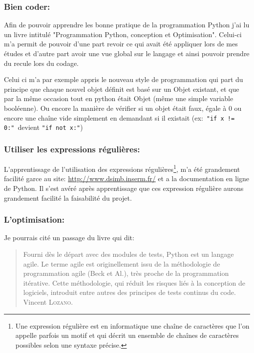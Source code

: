         \subsubsection{Bien coder:\label{pygood}}
Afin de pouvoir apprendre les bonne pratique de la programmation Python j'ai lu un livre intitulé "Programmation Python, conception et Optimisation"\cite{pybook}. Celui-ci m'a permit de pouvoir d'une part revoir ce qui avait été appliquer lors de mes études et d'autre part avoir une vue global sur le langage et ainsi pouvoir prendre du recule lors du codage.

Celui ci m'a par exemple appris le nouveau style de programmation qui part du principe que chaque nouvel objet définit est basé sur un Objet existant, et que par la même occasion tout en python était Objet (même une simple variable booléenne). Ou encore la manière de vérifier si un objet était faux, égale à 0 ou encore une chaîne vide simplement en demandant si il existait (ex:~\texttt{"if x != 0:"}~devient \texttt{"if not x:"})

        \subsubsection{Utiliser les expressions régulières:} 
L'apprentissage de l'utilisation des expressions régulières\footnote{Une expression régulière est en informatique une chaîne de caractères que l’on appelle parfois un motif et qui décrit un ensemble de chaînes de caractères possibles selon une syntaxe précise.}, m'a été grandement facilité garce au site: \url{http://www.dsimb.inserm.fr/}\cite{re} et a la documentation en ligne de Python\cite{pydoc}. Il s'est avéré après apprentissage que ces expression régulière aurons grandement facilité la faisabilité du projet.

        \subsubsection{L'optimisation:}
Je pourrais cité un passage du livre\cite{pybook} qui dit:
\begin{quotation}
    Fourni dès le départ avec des modules de tests, Python est un langage agile. Le terme agile est originellement issu de la méthodologie de programmation agile (Beck et Al.), très proche de la programmation itérative. Cette méthodologie, qui réduit les risques liés à la conception de logiciels, introduit entre autres des principes de tests continus du code.
    \raggedleft Vincent \textsc{Lozano}.
\end{quotation}

